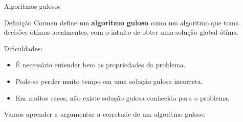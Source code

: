 \begin{frame}{Algoritmos gulosos}

    \begin{block}{Definição}
        Cormen define um {\bf algoritmo guloso} como um algoritmo que toma decisões ótimas localmentes, com o intuito de obter uma solução global ótima.
    \end{block} \pause

    Dificuldades:
    \begin{itemize} \pause
        \item É necessário entender bem as propriedades do problema. \pause
        \item Pode-se perder muito tempo em uma solução gulosa incorreta. \pause
        \item Em muitos casos, não existe solução gulosa conhecida para o problema.
    \end{itemize} \pause

    Vamos aprender a argumentar a corretude de um algoritmo guloso.

    
\end{frame}

